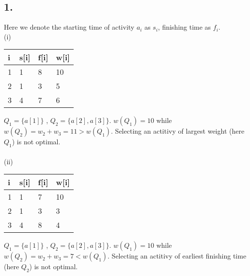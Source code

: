 \documentclass[twoside,11pt]{homework}
\begin{document}
\subsection*{1.}
Here we denote the starting time of activity $a_i$ as $s_i$, finishing time as $f_i$.
\\(i)
%
\begin{table}[ht]\centering
\begin{tabular}{|l|l|l|l|}
\hline
i & s{[}i{]} & f{[}i{]} & w{[}i{]} \\ \hline
1        & 1        & 8        & 10       \\ \hline
2        & 1        & 3        & 5        \\ \hline
3        & 4        & 7        & 6        \\ \hline
\end{tabular}
\end{table}
%
$Q_1 = \{a[1]\}$ , $Q_2 = \{a[2], a[3]\}$.
$w(Q_1) = 10$ while $w(Q_2) = w_2 + w_3 = 11 > w(Q_1)$.
Selecting an actitivy of largest weight (here $Q_1$) is not optimal.
\\\\
(ii)
%
\begin{table}[ht]\centering
\begin{tabular}{|l|l|l|l|}
\hline
i & s{[}i{]} & f{[}i{]} & w{[}i{]} \\ \hline
1        & 1        & 7        & 10       \\ \hline
2        & 1        & 3        & 3        \\ \hline
3        & 4        & 8        & 4        \\ \hline
\end{tabular}
\end{table}
%
$Q_1 = \{a[1]\}$ , $Q_2 = \{a[2], a[3]\}$.
$w(Q_1) = 10$ while $w(Q_2) = w_2 + w_3 = 7 < w(Q_1)$.
Selecting an actitivy of earliest finishing time (here $Q_2$) is not optimal.
\end{document}
